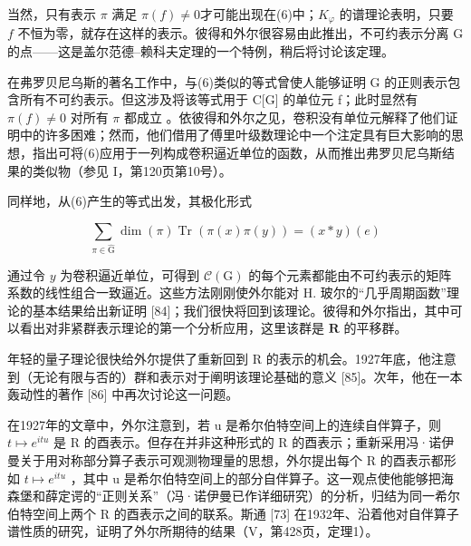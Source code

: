 当然，只有表示 \(\pi\) 满足 \(\pi(f) \neq 0\)才可能出现在(6)中；\(K_{\varphi}\) 的谱理论表明，只要 \(f\) 不恒为零，就存在这样的表示。彼得和外尔很容易由此推出，不可约表示分离 G 的点——这是盖尔范德--赖科夫定理的一个特例，稍后将讨论该定理。

在弗罗贝尼乌斯的著名工作中，与(6)类似的等式曾使人能够证明 G 的正则表示包含所有不可约表示。但这涉及将该等式用于 C{[}G{]} 的单位元 f；此时显然有 \(\pi(f) \neq 0\) 对所有 \(\pi\) 都成立 。依彼得和外尔之见，卷积没有单位元解释了他们证明中的许多困难；然而，他们借用了傅里叶级数理论中一个注定具有巨大影响的思想，指出可将(6)应用于一列构成卷积逼近单位的函数，从而推出弗罗贝尼乌斯结果的类似物（参见 I，第120页第10号）。

同样地，从(6)产生的等式出发，其极化形式

\[
\sum_ {\pi \in \widehat {\mathrm{G}}} \dim (\pi) \operatorname{Tr} (\pi (x) \pi (y)) = (x * y) (e)\tag{7}
\]

通过令 \(y\) 为卷积逼近单位，可得到 \(\mathcal{C}(\mathrm{G})\) 的每个元素都能由不可约表示的矩阵系数的线性组合一致逼近。这些方法刚刚使外尔能对 H. 玻尔的“几乎周期函数”理论的基本结果给出新证明 {[}84{]}；我们很快将回到该理论。彼得和外尔指出，其中可以看出对非紧群表示理论的第一个分析应用，这里该群是 \(\mathbf{R}\) 的平移群。

年轻的量子理论很快给外尔提供了重新回到 R 的表示的机会。1927年底，他注意到（无论有限与否的）群和表示对于阐明该理论基础的意义 {[}85{]}。次年，他在一本轰动性的著作 {[}86{]} 中再次讨论这一问题。

在1927年的文章中，外尔注意到，若 u 是希尔伯特空间上的连续自伴算子，则 \(t \mapsto e^{itu}\) 是 R 的酉表示。但存在并非这种形式的 R 的酉表示；重新采用冯·诺伊曼关于用对称部分算子表示可观测物理量的思想，外尔提出每个 R 的酉表示都形如 \(t \mapsto e^{itu}\) ，其中 u 是希尔伯特空间上的部分自伴算子。这一观点使他能够把海森堡和薛定谔的“正则关系”（冯·诺伊曼已作详细研究）的分析，归结为同一希尔伯特空间上两个 R 的酉表示之间的联系。斯通 {[}73{]} 在1932年、沿着他对自伴算子谱性质的研究，证明了外尔所期待的结果（V，第428页，定理1）。

